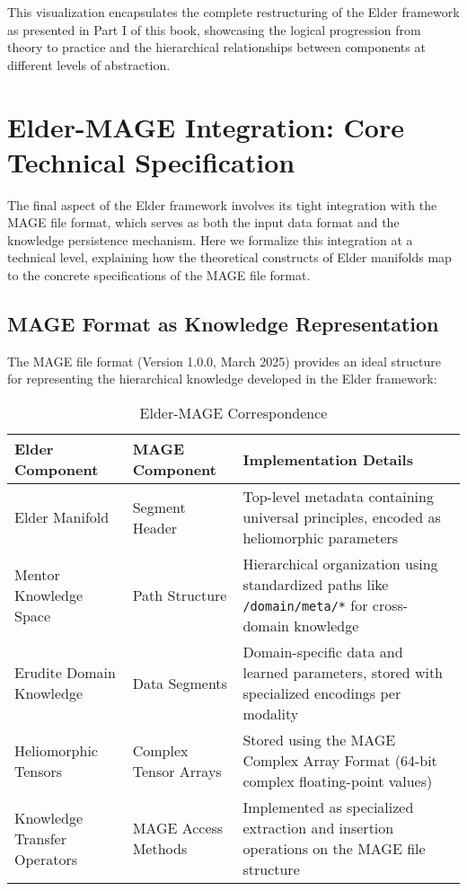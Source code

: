 This visualization encapsulates the complete restructuring of the Elder framework as presented in Part I of this book, showcasing the logical progression from theory to practice and the hierarchical relationships between components at different levels of abstraction.

\section{Elder-MAGE Integration: Core Technical Specification}

The final aspect of the Elder framework involves its tight integration with the MAGE file format, which serves as both the input data format and the knowledge persistence mechanism. Here we formalize this integration at a technical level, explaining how the theoretical constructs of Elder manifolds map to the concrete specifications of the MAGE file format.

\subsection{MAGE Format as Knowledge Representation}

The MAGE file format (Version 1.0.0, March 2025) provides an ideal structure for representing the hierarchical knowledge developed in the Elder framework:

\begin{table}[h]
\centering
\caption{Elder-MAGE Correspondence}
\begin{tabular}{|p{4cm}|p{4cm}|p{5cm}|}
\hline
\textbf{Elder Component} & \textbf{MAGE Component} & \textbf{Implementation Details} \\
\hline
Elder Manifold & Segment Header & Top-level metadata containing universal principles, encoded as heliomorphic parameters \\
\hline
Mentor Knowledge Space & Path Structure & Hierarchical organization using standardized paths like \texttt{/domain/meta/*} for cross-domain knowledge \\
\hline
Erudite Domain Knowledge & Data Segments & Domain-specific data and learned parameters, stored with specialized encodings per modality \\
\hline
Heliomorphic Tensors & Complex Tensor Arrays & Stored using the MAGE Complex Array Format (64-bit complex floating-point values) \\
\hline
Knowledge Transfer Operators & MAGE Access Methods & Implemented as specialized extraction and insertion operations on the MAGE file structure \\
\hline
\end{tabular}
\label{tab:elder_mage_correspondence}
\end{table}

